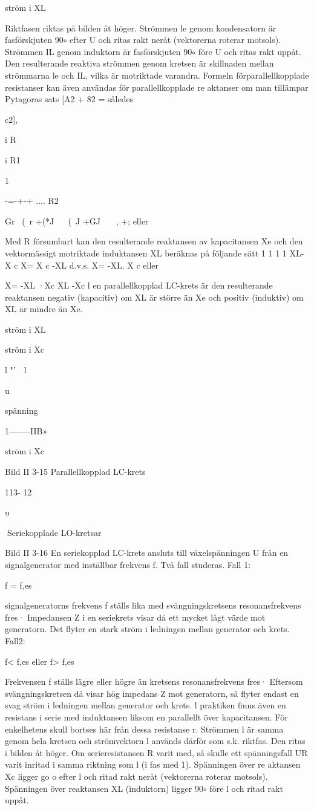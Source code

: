 {ström i XL

Riktfasen riktas på bilden åt höger. Strömmen le genom kondensatorn är fasförskjuten 90\(\circ\) efter U och ritas rakt neråt (vektorerna roterar motsols). Strömmen IL genom
induktorn är fasförskjuten 90\(\circ\) före U och
ritas rakt uppåt. Den resulterande reaktiva
strömmen genom kretsen är skillnaden mellan strömmarna le och IL, vilka är motriktade
varandra.
Formeln förparallellkopplade resistanser
kan även användas för parallellkopplade
re aktanser om man tillämpar Pytagoras sats
[A2 + 82 =
således

c2],

i
R

i
R1

1

-=-+-+ ....
R2

Gr ~(~r +(*J
~~ (~J +GJ ~~~, +;
eller

Med R försumbart kan den resulterande
reaktansen av kapacitansen Xe och den
vektormässigt motriktade induktansen XL beräknas på följande sätt
1
1
1
1 XL- X c
X= X c -XL d.v.s. X= -XL. X c eller

X= -XL ·Xc
XL -Xc
l en parallellkopplad LC-krets är den resulterande reaktansen negativ (kapacitiv) om XL
är större än Xe och positiv (induktiv) om XL är
mindre än Xe.

ström i XL

ström i Xc

l "'~~l

u

spänning

1--------IIB»

ström i Xc

Bild II 3-15 Parallellkopplad LC-krets

113- 12

u

Seriekopplade LO-kretsar

Bild II 3-16
En seriekopplad LC-krets ansluts till växelspänningen U från en signalgenerator med
inställbar frekvens f. Två fall studeras.
Fall 1:

f = f,es

signalgeneratorns frekvens f ställs lika
med svängningskretsens resonansfrekvens
fres· Impedansen Z i en seriekrets visar då ett
mycket lågt värde mot generatorn. Det flyter
en stark ström i ledningen mellan generator
och krets.
Fall2:

f< f,es eller f> f,es

Frekvensen f ställs lägre eller högre än
kretsens resonansfrekvens fres·
Eftersom svängningskretsen då visar hög
impedans Z mot generatorn, så flyter endast
en svag ström i ledningen mellan generator
och krets.
l praktiken finns även en resistans i serie
med induktansen liksom en parallellt över
kapacitansen. För enkelhetens skull bortses
här från dessa resistanse r.
Strömmen l är samma genom hela kretsen och strömvektorn l används därför som
s.k. riktfas. Den ritas i bilden åt höger. Om
serieresistansen R varit med, så skulle ett
spänningsfall UR varit inritad i samma riktning som l (i fas med 1). Spänningen över
re aktansen Xc ligger go o efter l och ritad rakt
neråt (vektorerna roterar motsols). Spänningen över reaktansen XL (induktorn) ligger
90\(\circ\) före l och ritad rakt uppåt.

}

